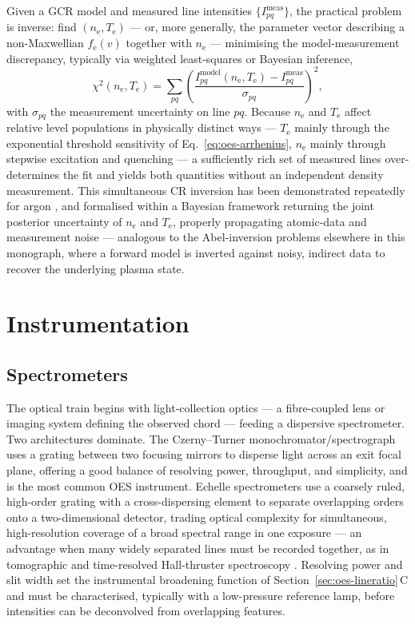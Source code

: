 Given a GCR model and measured line intensities $\{I_{pq}^{\mathrm{meas}}\}$, the practical problem is inverse: find $(n_{\mathrm{e}},T_{\mathrm{e}})$ — or, more generally, the parameter vector describing a non-Maxwellian $f_{\mathrm{e}}(v)$ together with $n_{\mathrm{e}}$ — minimising the model-measurement discrepancy, typically via weighted least-squares or Bayesian inference,
\begin{equation}
\chi^{2}(n_{\mathrm{e}}, T_{\mathrm{e}}) = \sum_{pq} \left(\frac{I_{pq}^{\mathrm{model}}(n_{\mathrm{e}}, T_{\mathrm{e}}) - I_{pq}^{\mathrm{meas}}}{\sigma_{pq}}\right)^{2},
\label{eq:oes-chisq}
\end{equation}
with $\sigma_{pq}$ the measurement uncertainty on line $pq$. Because $n_{\mathrm{e}}$ and $T_{\mathrm{e}}$ affect relative level populations in physically distinct ways — $T_{\mathrm{e}}$ mainly through the exponential threshold sensitivity of Eq.~\eqref{eq:oes-arrhenius}, $n_{\mathrm{e}}$ mainly through stepwise excitation and quenching — a sufficiently rich set of measured lines over-determines the fit and yields both quantities without an independent density measurement. This simultaneous CR inversion has been demonstrated repeatedly for argon \cite{ref0237,ref0245,ref0260}, and formalised within a Bayesian framework returning the joint posterior uncertainty of $n_{\mathrm{e}}$ and $T_{\mathrm{e}}$, properly propagating atomic-data and measurement noise \cite{ref0275} — analogous to the Abel-inversion problems elsewhere in this monograph, where a forward model is inverted against noisy, indirect data to recover the underlying plasma state.

\section{Instrumentation}
\label{sec:oes-instrumentation}

\subsection{Spectrometers}

The optical train begins with light-collection optics — a fibre-coupled lens or imaging system defining the observed chord — feeding a dispersive spectrometer. Two architectures dominate. The Czerny–Turner monochromator/spectrograph uses a grating between two focusing mirrors to disperse light across an exit focal plane, offering a good balance of resolving power, throughput, and simplicity, and is the most common OES instrument. Echelle spectrometers use a coarsely ruled, high-order grating with a cross-dispersing element to separate overlapping orders onto a two-dimensional detector, trading optical complexity for simultaneous, high-resolution coverage of a broad spectral range in one exposure — an advantage when many widely separated lines must be recorded together, as in tomographic and time-resolved Hall-thruster spectroscopy \cite{ref0256,ref0257}. Resolving power and slit width set the instrumental broadening function of Section~\ref{sec:oes-lineratio}\,C and must be characterised, typically with a low-pressure reference lamp, before intensities can be deconvolved from overlapping features.

